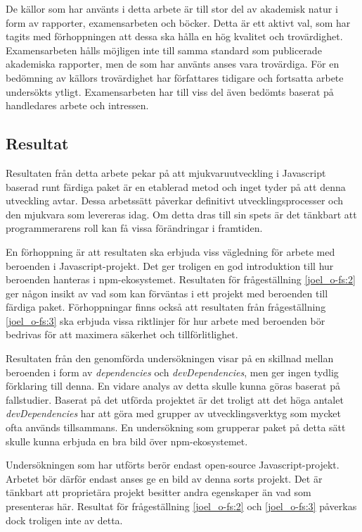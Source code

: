 De källor som har använts i detta arbete är till stor del av akademisk natur i form av rapporter, examensarbeten och böcker. Detta är ett aktivt val, som har tagits med förhoppningen att dessa ska hålla en hög kvalitet och trovärdighet. Examensarbeten hålls möjligen inte till samma standard som publicerade akademiska rapporter, men de som har använts anses vara trovärdiga. För en bedömning av källors trovärdighet har författares tidigare och fortsatta arbete undersökts ytligt. Examensarbeten har till viss del även bedömts baserat på handledares arbete och intressen.

\subsection{Resultat}
\label{subsec:joel_o-discussion-results}
Resultaten från detta arbete pekar på att mjukvaruutveckling i Javascript baserad runt färdiga paket är en etablerad metod och inget tyder på att denna utveckling avtar. Dessa arbetssätt påverkar definitivt utvecklingsprocesser och den mjukvara som levereras idag. Om detta dras till sin spets är det tänkbart att programmerarens roll kan få vissa förändringar i framtiden.

En förhoppning är att resultaten ska erbjuda viss vägledning för arbete med beroenden i Javascript-projekt. Det ger troligen en god introduktion till hur beroenden hanteras i npm-ekosystemet. Resultaten för frågeställning \ref{joel_o-fs:2} ger någon insikt av vad som kan förväntas i ett projekt med beroenden till färdiga paket. Förhoppningar finns också att resultaten från frågeställning \ref{joel_o-fs:3} ska erbjuda vissa riktlinjer för hur arbete med beroenden bör bedrivas för att maximera säkerhet och tillförlitlighet.

Resultaten från den genomförda undersökningen visar på en skillnad mellan beroenden i form av \textit{dependencies} och \textit{devDependencies}, men ger ingen tydlig förklaring till denna. En vidare analys av detta skulle kunna göras baserat på fallstudier. Baserat på det utförda projektet är det troligt att det höga antalet \textit{devDependencies} har att göra med grupper av utvecklingsverktyg som mycket ofta används tillsammans. En undersökning som grupperar paket på detta sätt skulle kunna erbjuda en bra bild över npm-ekosystemet.

Undersökningen som har utförts berör endast open-source Javascript-projekt. Arbetet bör därför endast anses ge en bild av denna sorts projekt. Det är tänkbart att proprietära projekt besitter andra egenskaper än vad som presenteras här. Resultat för frågeställning \ref{joel_o-fs:2} och \ref{joel_o-fs:3} påverkas dock troligen inte av detta.
